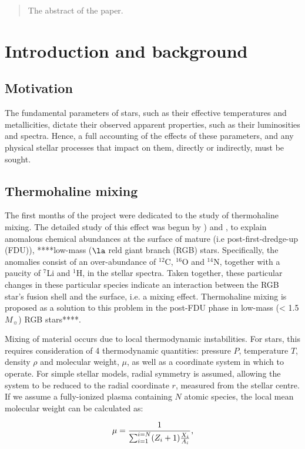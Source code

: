 \documentclass[usenatbib]{mnras}
\begin{document}
\begin{abstract}
The abstract of the paper.
\end{abstract}

\section{Introduction and background}
\subsection{Motivation}
The fundamental parameters of stars, such as their effective temperatures and metallicities, dictate their observed apparent properties, such as their luminosities and spectra. Hence, a full accounting of the effects of these parameters, and any physical stellar processes that impact on them, directly or indirectly, must be sought.

\subsection{Thermohaline mixing}
The first months of the project were dedicated to the study of thermohaline mixing. The detailed study of this effect was begun by \citet{1972ApJ...172..165U}) and \citet{1980A&A....91..175K}, to explain anomalous chemical abundances at the surface of mature (i.e post-first-dredge-up (FDU)), ****low-mass ($\la$ reld giant branch (RGB) stars. Specifically, the anomalies consist of an over-abundance of $^{12}$C, $^{16}$O and $^{14}$N, together with a paucity of $^{7}$Li and $^{1}$H, in the stellar spectra. Taken together, these particular changes in these particular species indicate an interaction between the RGB star's fusion shell and the surface, i.e. a mixing effect. Thermohaline mixing is proposed as a solution to this problem in the post-FDU phase in low-mass (< 1.5$M_{\sun}$) RGB stars****.

Mixing of material occurs due to local thermodynamic instabilities. For stars, this requires consideration of 4 thermodynamic quantities: pressure $P$, temperature $T$, density $\rho$ and molecular weight, $\mu$, as well as a coordinate system in which to operate. For simple stellar models, radial symmetry is assumed, allowing the system to be reduced to the radial coordinate $r$, measured from the stellar centre. If we assume a fully-ionized plasma containing $N$ atomic species, the local mean molecular weight can be calculated as:

\begin{equation}
\mu = \frac{1}{\sum_{i=1}^{i=N} (Z_{i}+1) \frac{X_{i}}{A_{i}}} \textnormal{,}
\label{mol_weight_def}
\end{equation}
\end{document}
